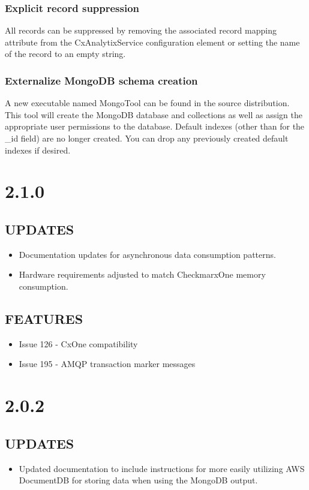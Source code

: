     \subsubsection*{Explicit record suppression}
    All records can be suppressed by removing the associated record mapping attribute from the CxAnalytixService configuration element 
    or setting the name of the record to an empty string.

    \subsubsection*{Externalize MongoDB schema creation}
    A new executable named MongoTool can be found in the source distribution.  This tool will create the MongoDB database and collections
    as well as assign the appropriate user permissions to the database.  Default indexes (other than for the \_id field) are no longer created.  You can drop
    any previously created default indexes if desired.


\section{2.1.0}

\subsection*{UPDATES}
\begin{itemize}
    \item Documentation updates for asynchronous data consumption patterns.
    \item Hardware requirements adjusted to match CheckmarxOne memory consumption.
\end{itemize}

\subsection*{FEATURES}
    \begin{itemize}
        \item Issue 126 - CxOne compatibility
        \item Issue 195 - AMQP transaction marker messages
    \end{itemize}

\section{2.0.2}

\subsection*{UPDATES}
\begin{itemize}
    \item Updated documentation to include instructions for more easily 
    utilizing AWS DocumentDB for storing data when using the MongoDB
    output.
\end{itemize}

